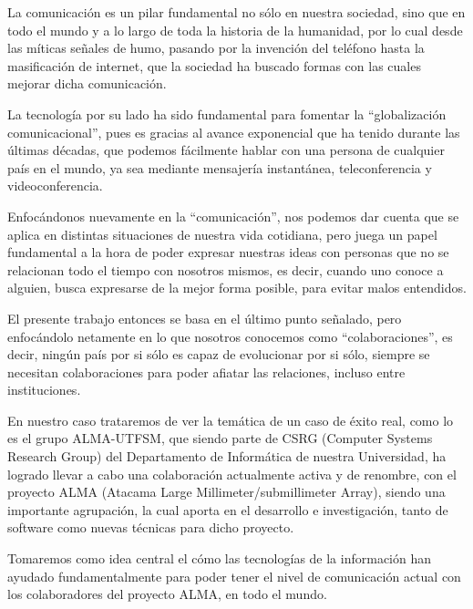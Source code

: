 La comunicación es un pilar fundamental no sólo en nuestra sociedad,
sino que en todo el mundo y a lo largo de toda la historia de la humanidad,
por lo cual desde las míticas señales de humo, pasando por la invención del
teléfono hasta la masificación de internet, que la sociedad ha buscado formas
con las cuales mejorar dicha comunicación.

La tecnología por su lado ha sido fundamental para fomentar la ``globalización
comunicacional'', pues es gracias al avance exponencial que ha tenido durante
las últimas décadas, que podemos fácilmente hablar con una persona de cualquier
país en el mundo, ya sea mediante mensajería instantánea, teleconferencia y 
videoconferencia.

Enfocándonos nuevamente en la ``comunicación'', nos podemos dar cuenta que se
aplica en distintas situaciones de nuestra vida cotidiana, pero juega un papel
fundamental a la hora de poder expresar nuestras ideas con personas que no se
relacionan todo el tiempo con nosotros mismos, es decir, cuando uno conoce a
alguien, busca expresarse de la mejor forma posible, para evitar malos entendidos.

El presente trabajo entonces se basa en el último punto señalado, pero enfocándolo
netamente en lo que nosotros conocemos como ``colaboraciones'', es decir, ningún país
por si sólo es capaz de evolucionar por si sólo, siempre se necesitan colaboraciones
para poder afiatar las relaciones, incluso entre instituciones.

En nuestro caso trataremos de ver la temática de un caso de éxito real, como lo es
el grupo ALMA-UTFSM, que siendo parte de CSRG (Computer Systems Research Group) 
del Departamento de Informática de nuestra Universidad, ha logrado llevar a cabo
una colaboración actualmente activa y de renombre, con el proyecto ALMA (Atacama Large
Millimeter/submillimeter Array), siendo una importante agrupación, la cual aporta 
en el desarrollo e investigación, tanto de software como nuevas técnicas 
para dicho proyecto.

Tomaremos como idea central el cómo las tecnologías de la información han ayudado
fundamentalmente para poder tener el nivel de comunicación actual con los colaboradores
del proyecto ALMA, en todo el mundo.
